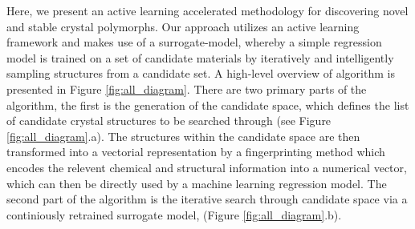 
%
%
%
%
%



%
%
Here, we present an active learning accelerated methodology for discovering novel and stable crystal polymorphs.
%
Our approach utilizes an active learning framework and makes use of a surrogate-model,
whereby a simple regression model is trained on a set of candidate materials by iteratively and intelligently sampling structures from a candidate set.
%
A high-level overview of algorithm is presented in Figure \ref{fig:all_diagram}.
%
There are two primary parts of the algorithm, the first is the generation of the candidate space,
which defines the list of candidate crystal structures to be searched through (see Figure \ref{fig:all_diagram}.a).
%
The structures within the candidate space are then transformed into a vectorial representation by a fingerprinting method which encodes the relevent chemical and structural information into a numerical vector,
which can then be directly used by a machine learning regression model.
%
The second part of the algorithm is the iterative search through candidate space via a continiously retrained surrogate model, (Figure \ref{fig:all_diagram}.b).



